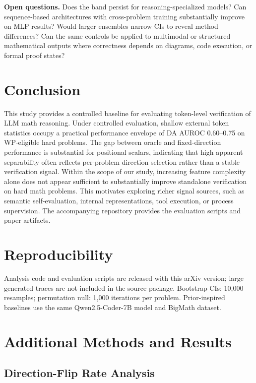 \documentclass{article}
\begin{document}
\textbf{Open questions.} Does the band persist for reasoning-specialized models? Can sequence-based architectures with cross-problem training substantially improve on MLP results? Would larger ensembles narrow CIs to reveal method differences? Can the same controls be applied to multimodal or structured mathematical outputs where correctness depends on diagrams, code execution, or formal proof states?

\section{Conclusion}
\label{sec:conclusion}

This study provides a controlled baseline for evaluating token-level verification of LLM math reasoning. Under controlled evaluation, shallow external token statistics occupy a practical performance envelope of DA AUROC 0.60--0.75 on WP-eligible hard problems. The gap between oracle and fixed-direction performance is substantial for positional scalars, indicating that high apparent separability often reflects per-problem direction selection rather than a stable verification signal. Within the scope of our study, increasing feature complexity alone does not appear sufficient to substantially improve standalone verification on hard math problems. This motivates exploring richer signal sources, such as semantic self-evaluation, internal representations, tool execution, or process supervision. The accompanying repository provides the evaluation scripts and paper artifacts.

\section*{Reproducibility}
Analysis code and evaluation scripts are released with this arXiv version; large generated traces are not included in the source package. Bootstrap CIs: 10,000 resamples; permutation null: 1,000 iterations per problem. Prior-inspired baselines use the same Qwen2.5-Coder-7B model and BigMath dataset.

\appendix
\section{Additional Methods and Results}
\label{app:additional}

\subsection{Direction-Flip Rate Analysis}
\label{app:fliprate}
\end{document}
